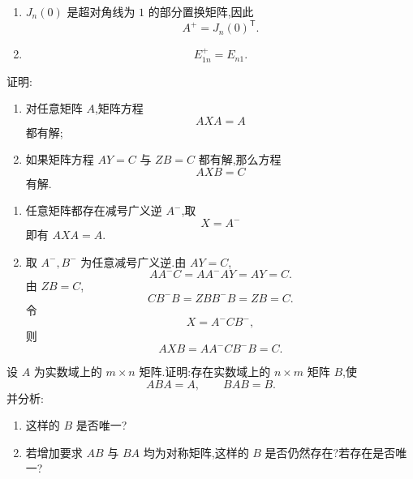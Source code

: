 \begin{solution}
\begin{enumerate}
\[  \qquad
  v=\begin{pmatrix}a\\b\\c\end{pmatrix}.
  \]
  则
  \[
  \boxed{
  A^+
  =\dfrac{1}{14(a^2+b^2+c^2)}
  \begin{pmatrix}
a&2a&3a\\
b&2b&3b\\
c&2c&3c
\end{pmatrix}
  }.
  \]
  \item $J_n(0)$ 是超对角线为 $1$ 的部分置换矩阵,因此
  \[
  \boxed{A^+=J_n(0)^{\mathsf T}}.
  \]
  \item
  \[
  \boxed{E_{1n}^+=E_{n1}}.
  \]
\end{enumerate}
\end{solution}

\begin{example}
证明:
\begin{enumerate}
  \item 对任意矩阵 $A$,矩阵方程
  \[
  AXA=A
  \]
  都有解;
  \item 如果矩阵方程 $AY=C$ 与 $ZB=C$ 都有解,那么方程
  \[
  AXB=C
  \]
  有解.
\end{enumerate}
\end{example}
\exampleblank

\begin{solution}
\leavevmode
\begin{enumerate}
  \item 任意矩阵都存在减号广义逆 $A^-$,取
  \[
  X=A^-
  \]
  即有 $AXA=A$.

  \item 取 $A^-,B^-$ 为任意减号广义逆.由 $AY=C$,
  \[
  AA^-C=AA^-AY=AY=C.
  \]
  由 $ZB=C$,
  \[
  CB^-B=ZBB^-B=ZB=C.
  \]
  令
  \[
  X=A^-CB^-,
  \]
  则
  \[
  AXB=AA^-CB^-B=C.
  \]
\end{enumerate}
\end{solution}

\begin{example}
设 $A$ 为实数域上的 $m\times n$ 矩阵.证明:存在实数域上的 $n\times m$ 矩阵 $B$,使
\[
ABA=A,
\qquad
BAB=B.
\]
并分析:
\begin{enumerate}
  \item 这样的 $B$ 是否唯一?
  \item 若增加要求 $AB$ 与 $BA$ 均为对称矩阵,这样的 $B$ 是否仍然存在?若存在是否唯一?
\end{enumerate}
\end{example}
\exampleblank

